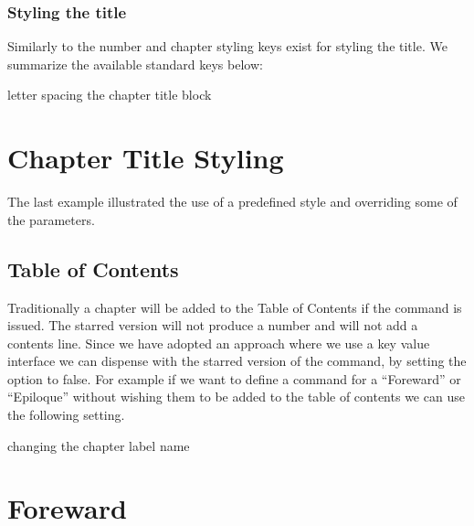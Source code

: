 \subsection{Styling the title}

Similarly to the number and chapter styling keys exist for styling the title. We summarize the available standard keys below:
\medskip



\begin{texexample}{letter spacing the chapter title block}{}
\chapter{Chapter Title Styling}
\end{texexample}



The last example illustrated the use of a predefined style  and overriding some of the parameters.


\section{Table of Contents}

Traditionally a chapter will be added to the Table of Contents if the  command is issued. The starred version will not produce a number and will not add a contents line. Since we have adopted an approach where we use a key value interface we can dispense with the starred version of the command, by setting the  option to false. For example if we want to define a command for a ``Foreward'' or ``Epiloque'' without wishing them to be added to the table of contents we can use the following setting.



\begin{texexample}{changing the chapter label name}{}
\chapter{Foreward}
\lorem
\end{texexample}

